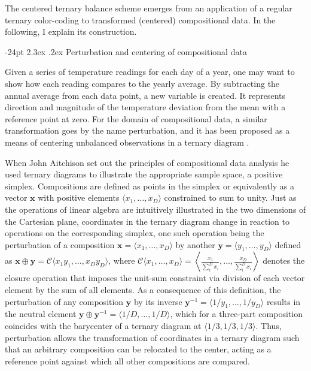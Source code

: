 \documentclass[10pt,twoside,reqno]{article}
\makeatletter
\renewcommand\section{\@startsection {section}{1}{\z@}%
                                   {-24pt}%
                                   {2.3ex \@plus.2ex}%
                                   {\normalfont\large\bfseries}}
\makeatother
\begin{document}
The centered ternary balance scheme emerges from an application of a
regular ternary color-coding to transformed (centered) compositional
data. In the following, I explain its construction.

\hypertarget{perturbation-and-centering-of-compositional-data}{%
\section{Perturbation and centering of compositional
data}\label{perturbation-and-centering-of-compositional-data}}

Given a series of temperature readings for each day of a year, one may
want to show how each reading compares to the yearly average. By
subtracting the annual average from each data point, a new variable is
created. It represents direction and magnitude of the temperature
deviation from the mean with a reference point at zero. For the domain
of compositional data, a similar transformation goes by the name
perturbation, and it has been proposed as a means of centering
unbalanced observations in a ternary diagram
\citep{VonEynatten2002, PawlowskyGlahn2002}.

When John Aitchison set out the principles of compositional data
analysis \citep{Aitchison1982, Aitchison1986, PawlowskyGlahn2015} he
used ternary diagrams to illustrate the appropriate sample space, a
positive simplex. Compositions are defined as points in the simplex or
equivalently as a vector \(\mathbf{x}\) with positive elements
\(\langle x_1,\ldots,x_D \rangle\) constrained to sum to unity. Just as
the operations of linear algebra are intuitively illustrated in the two
dimensions of the Cartesian plane, coordinates in the ternary diagram
change in reaction to operations on the corresponding simplex, one such
operation being the perturbation of a composition
\(\mathbf{x}=\langle x_1, \ldots, x_D \rangle\) by another
\(\mathbf{y}=\langle y_1, \ldots, y_D \rangle\) defined as
\(\mathbf{x}\oplus \mathbf{y}=\mathcal{C}\langle x_1y_1, \ldots, x_Dy_D \rangle\),
where
\(\mathcal{C}\langle x_1, \ldots, x_D \rangle = \left\langle\frac{x_1}{\sum_i^D x_i},\ldots, \frac{x_D}{\sum_i^D x_i}\right\rangle\)
denotes the closure operation that imposes the unit-sum constraint via
division of each vector element by the sum of all elements. As a
consequence of this definition, the perturbation of any composition
\(\mathbf{y}\) by its inverse
\(\mathbf{y}^{-1}=\langle 1/y_1, \ldots, 1/y_D \rangle\) results in the
neutral element
\(\mathbf{y}\oplus \mathbf{y}^{-1}=\langle 1/D, \ldots, 1/D \rangle\),
which for a three-part composition coincides with the barycenter of a
ternary diagram at \(\langle 1/3, 1/3, 1/3 \rangle\). Thus, perturbation
allows the transformation of coordinates in a ternary diagram such that
an arbitrary composition can be relocated to the center, acting as a
reference point against which all other compositions are compared.
\end{document}
